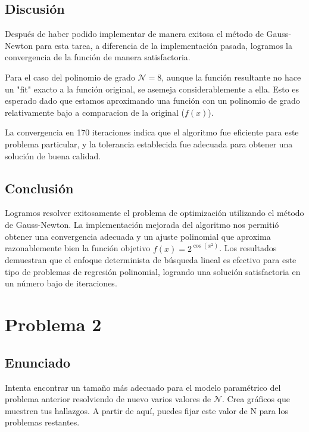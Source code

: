 \documentclass{article}
\begin{document}
\subsection{Discusión}

Después de haber podido implementar de manera exitosa el método de Gauss-Newton para esta tarea, a diferencia de la implementación pasada, logramos la convergencia de la función de manera satisfactoria. 

Para el caso del polinomio de grado $\mathcal{N}=8$, aunque la función resultante no hace un "fit" exacto a la función original, se asemeja considerablemente a ella. Esto es esperado dado que estamos aproximando una función con un polinomio de grado relativamente bajo a comparacion de la original ($f(x)$).

La convergencia en 170 iteraciones indica que el algoritmo fue eficiente para este problema particular, y la tolerancia establecida fue adecuada para obtener una solución de buena calidad.

\subsection{Conclusión}

Logramos resolver exitosamente el problema de optimización utilizando el método de Gauss-Newton. La implementación mejorada del algoritmo nos permitió obtener una convergencia adecuada y un ajuste polinomial que aproxima razonablemente bien la función objetivo $f(x) = 2^{\cos(x^2)}$. Los resultados demuestran que el enfoque determinista de búsqueda lineal es efectivo para este tipo de problemas de regresión polinomial, logrando una solución satisfactoria en un número bajo de iteraciones.


\section{Problema 2}

\subsection{Enunciado}

Intenta encontrar un tamaño más adecuado para el modelo paramétrico del problema anterior resolviendo de nuevo varios valores de $\mathcal{N}$. Crea gráficos que muestren tus hallazgos. A partir de aquí, puedes fijar este valor de N para los problemas restantes.
\end{document}
